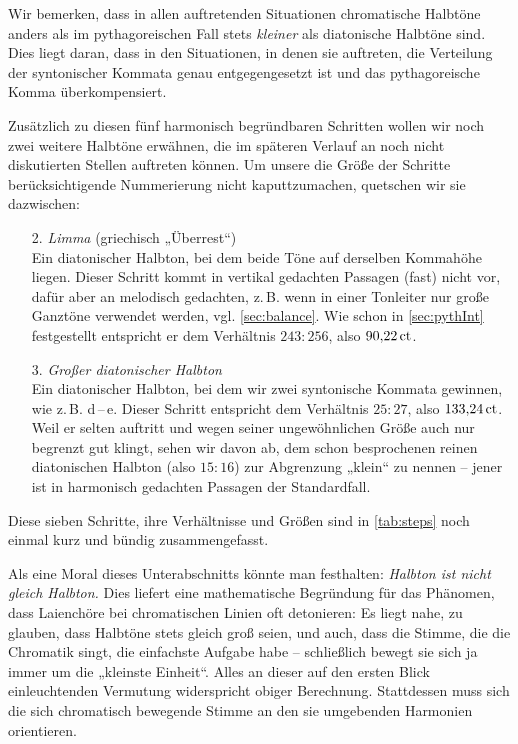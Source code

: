 Wir bemerken, dass in allen auftretenden Situationen chromatische
Halbtöne anders als im pythagoreischen Fall stets \emph{kleiner} als
diatonische Halbtöne sind.  Dies liegt daran, dass in den Situationen,
in denen sie auftreten, die Verteilung der syntonischer Kommata genau
entgegengesetzt ist und das pythagoreische Komma überkompensiert.

Zusätzlich zu diesen fünf harmonisch begründbaren Schritten wollen wir noch zwei
weitere Halbtöne erwähnen, die im späteren Verlauf an noch nicht
diskutierten Stellen auftreten können. Um unsere die Größe der Schritte
berücksichtigende Nummerierung nicht kaputtzumachen, quetschen wir sie dazwischen:

\begin{enumerate}
\item[2\pazofrac12.] \emph{Limma} (griechisch „Überrest“)\\
  Ein diatonischer Halbton, bei dem beide Töne auf derselben Kommahöhe liegen.
  Dieser Schritt kommt in vertikal gedachten Passagen (fast) nicht vor, dafür
  aber an melodisch gedachten, z.\,B. wenn in einer Tonleiter nur große Ganztöne
  verwendet werden, vgl. \cref{sec:balance}. Wie schon in \cref{sec:pythInt}
  festgestellt entspricht er dem Verhältnis $243:256$, also $90{,}22\,\text{ct}$.
\item[3\pazofrac12.] \emph{Großer diatonischer Halbton}\\
  Ein diatonischer Halbton, bei dem wir zwei syntonische Kommata gewinnen, wie
  z.\,B. \naturalm d\,–\,\flatp e. Dieser Schritt entspricht dem Verhältnis
  $25:27$, also $133{,}24\,\text{ct}$. Weil er selten auftritt und wegen seiner
  ungewöhnlichen Größe auch nur begrenzt gut klingt, sehen wir davon ab, dem
  schon besprochenen reinen diatonischen Halbton (also $15:16$) zur Abgrenzung
  „klein“ zu nennen – jener ist in harmonisch gedachten Passagen der
  Standardfall.
\end{enumerate}
Diese sieben Schritte, ihre Verhältnisse und Größen sind in \cref{tab:steps}
noch einmal kurz und bündig zusammengefasst.

Als eine Moral dieses Unterabschnitts könnte man festhalten:
\emph{Halbton ist nicht gleich Halbton.}  Dies liefert eine
mathematische Begründung für das Phänomen, dass Laienchöre bei chromatischen
Linien oft detonieren: Es liegt nahe, zu glauben, dass Halbtöne stets
gleich groß seien, und auch, dass die Stimme, die die Chromatik singt, die
einfachste Aufgabe habe – schließlich bewegt sie sich ja immer um die „kleinste
Einheit“. Alles an dieser auf den ersten Blick einleuchtenden Vermutung
widerspricht obiger Berechnung.  Stattdessen muss sich die sich chromatisch
bewegende Stimme an den sie umgebenden Harmonien orientieren.


